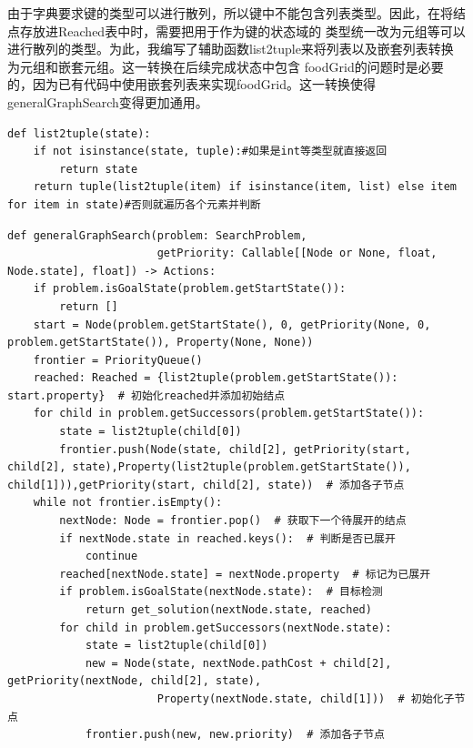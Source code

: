 由于字典要求键的类型可以进行散列，所以键中不能包含列表类型。因此，在将结点存放进Reached表中时，需要把用于作为键的状态域的
类型统一改为元组等可以进行散列的类型。为此，我编写了辅助函数list2tuple来将列表以及嵌套列表转换为元组和嵌套元组。这一转换在后续完成状态中包含
foodGrid的问题时是必要的，因为已有代码中使用嵌套列表来实现foodGrid。这一转换使得generalGraphSearch变得更加通用。

\begin{lstlisting}[emph={[3]state},emphstyle={[3]\color{vscode_parametercolor}}]
def list2tuple(state):
    if not isinstance(state, tuple):#如果是int等类型就直接返回
        return state
    return tuple(list2tuple(item) if isinstance(item, list) else item for item in state)#否则就遍历各个元素并判断
\end{lstlisting}

\begin{lstlisting}[emph={[3]problem,getPriority},emphstyle={[3]\color{vscode_parametercolor}},
    emph={[4]SearchProblem,Callable,Node,Actions,Reached},emphstyle={[4]\color{vscode_classcolor}}
    ]
def generalGraphSearch(problem: SearchProblem,
                       getPriority: Callable[[Node or None, float, Node.state], float]) -> Actions:
    if problem.isGoalState(problem.getStartState()):
        return []
    start = Node(problem.getStartState(), 0, getPriority(None, 0, problem.getStartState()), Property(None, None))
    frontier = PriorityQueue()
    reached: Reached = {list2tuple(problem.getStartState()): start.property}  # 初始化reached并添加初始结点
    for child in problem.getSuccessors(problem.getStartState()):
        state = list2tuple(child[0])
        frontier.push(Node(state, child[2], getPriority(start, child[2], state),Property(list2tuple(problem.getStartState()), child[1])),getPriority(start, child[2], state))  # 添加各子节点
    while not frontier.isEmpty():
        nextNode: Node = frontier.pop()  # 获取下一个待展开的结点
        if nextNode.state in reached.keys():  # 判断是否已展开
            continue
        reached[nextNode.state] = nextNode.property  # 标记为已展开
        if problem.isGoalState(nextNode.state):  # 目标检测
            return get_solution(nextNode.state, reached)
        for child in problem.getSuccessors(nextNode.state):
            state = list2tuple(child[0])
            new = Node(state, nextNode.pathCost + child[2], getPriority(nextNode, child[2], state),
                       Property(nextNode.state, child[1]))  # 初始化子节点
            frontier.push(new, new.priority)  # 添加各子节点
\end{lstlisting}


